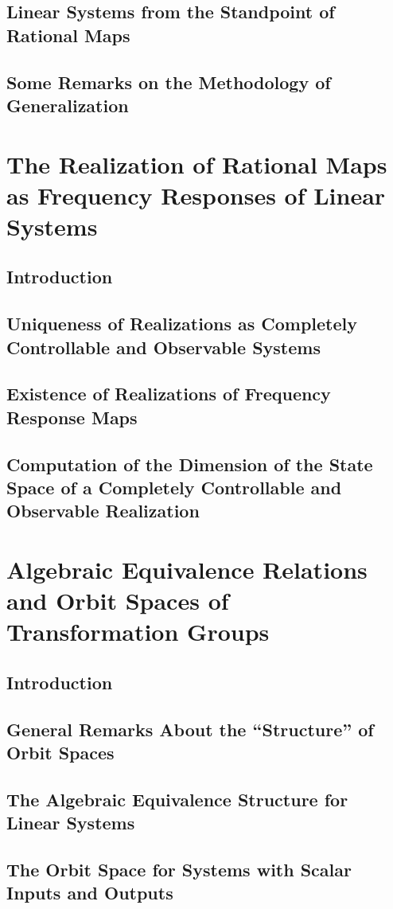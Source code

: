 \documentclass[12pt]{book}
\theoremstyle{plain}
\theoremstyle{definition}
\begin{document}
\section{Linear Systems from the Standpoint of Rational Maps}

\section{Some Remarks on the Methodology of Generalization}

\chapter{The Realization of Rational Maps as Frequency Responses of Linear Systems}

\section{Introduction}

\section{Uniqueness of Realizations as Completely Controllable and Observable Systems}

\section{Existence of Realizations of Frequency Response Maps}

\section{Computation of the Dimension of the State Space of a Completely Controllable and Observable Realization}

\chapter{Algebraic Equivalence Relations and Orbit Spaces of Transformation Groups}

\section{Introduction}

\section{General Remarks About the ``Structure'' of Orbit Spaces}

\section{The Algebraic Equivalence Structure for Linear Systems}

\section{The Orbit Space for Systems with Scalar Inputs and Outputs}

\end{document}

